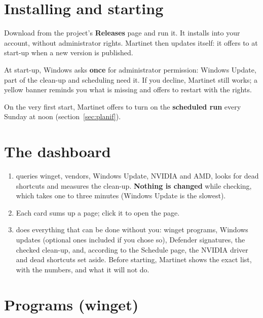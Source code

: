 \section{Installing and starting}

Download  from the project's \textbf{Releases} page and run it. It
installs into your account, without administrator rights. Martinet then updates itself: it offers to
at start-up when a new version is published.

At start-up, Windows asks \textbf{once} for administrator permission: Windows Update, part of the
clean-up and scheduling need it. If you decline, Martinet still works; a yellow banner reminds you
what is missing and offers to restart with the rights.

On the very first start, Martinet offers to turn on the \textbf{scheduled run} every Sunday at noon
(section~\ref{sec:planif}).

\section{The dashboard}\label{sec:accueil}


\begin{enumerate}
\item {} queries winget, vendors, Windows Update, NVIDIA and AMD, looks for dead
shortcuts and measures the clean-up. \textbf{Nothing is changed} while checking, which takes one to
three minutes (Windows Update is the slowest).
\item Each card sums up a page; click it to open the page.
\item {} does everything that can be done without you: winget programs,
Windows updates (optional ones included if you chose so), Defender signatures, the checked clean-up,
and, according to the Schedule page, the NVIDIA driver and dead shortcuts set aside. Before starting,
Martinet shows the exact list, with the numbers, and what it will not do.
\end{enumerate}


\section{Programs (winget)}\label{sec:programmes}

